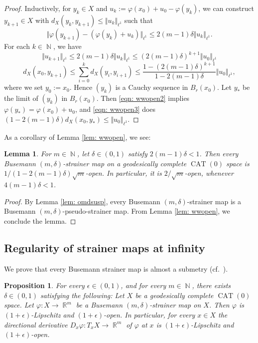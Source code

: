 \documentclass[a4paper,12pt]{amsart}
\newcommand{\CAT}{\operatorname{CAT}}
\newcommand{\R}{\operatorname{\mathbb{R}}}
\newcommand{\N}{\operatorname{\mathbb{N}}}
\numberwithin{equation}{section}
\theoremstyle{plain}
\newtheorem{lem}[thm]{Lemma}
\newtheorem{prop}[thm]{Proposition}
\theoremstyle{definition}
\theoremstyle{remark}
\begin{document}
\begin{proof}
Inductively,
for $y_k \in X$ and $u_k := \varphi(x_0) + u_0 - \varphi(y_k)$,
we can construct 
$y_{k+1} \in X$ with $d_X(y_k,y_{k+1}) \le \Vert u_k \Vert_{\ell^1}$
such that
\[
\Vert \varphi(y_{k+1}) - (\varphi(y_k) + u_k) \Vert_{\ell^1}
\le 2(m-1) \delta \Vert u_k \Vert_{\ell^1}.
\]
For each $k \in \N$, we have
\begin{equation}
\Vert u_{k+1} \Vert_{\ell^1}
\le 2(m-1) \delta \Vert u_k \Vert_{\ell^1}
\le (2(m-1) \delta)^{k+1} \Vert u_0 \Vert_{\ell^1}
\label{eqn: wwopen2}
\end{equation}
\begin{equation}
d_X(x_0,y_{k+1}) \le \sum_{i=0}^kd_X(y_i,y_{i+1})
\le \frac{1-(2(m-1)\delta)^{k+1}}{1-2(m-1)\delta} 
\Vert u_0 \Vert_{\ell^1},
\label{eqn: wwopen3}
\end{equation}
where we set $y_0 := x_0$.
Hence $(y_k)$ is a Cauchy sequence in $B_r(x_0)$.
Let $y_{\ast}$ be the limit of $(y_k)$ in $B_r(x_0)$.
Then \eqref{eqn: wwopen2} implies 
$\varphi(y_{\ast}) = \varphi(x_0) + u_0$,
and \eqref{eqn: wwopen3}
does
$(1-2(m-1)\delta) d_X(x_0,y_{\ast}) \le \Vert u_0 \Vert_{\ell^1}$.
\end{proof}

As a corollary of Lemma \ref{lem: wwopen},
we see:

\begin{lem}\label{lem: wopen}
For $m \in \N$, 
let $\delta \in (0,1)$ satisfy $2(m-1)\delta < 1$.
Then every Busemann $(m,\delta)$-strainer map 
on a geodesically complete $\CAT(0)$ space
is $1/(1-2(m-1)\delta)\sqrt{m}$-open.
In particular,
it is $2/\sqrt{m}$-open,
whenever $4(m-1)\delta < 1$.
\end{lem}

\begin{proof}
By Lemma \ref{lem: omdsusp},
every Busemann $(m,\delta)$-strainer map is
a Busemann $(m,\delta)$-pseudo-strainer map.
From Lemma \ref{lem: wwopen},
we conclude the lemma.
\end{proof}

\subsection{Regularity of strainer maps at infinity}

We prove that every Busemann strainer map
is almost a submetry
(cf.~\cite[Subsection 8.3]{lytchak-nagano1}).

\begin{prop}
\label{prop: almsubm}
For every $\epsilon \in (0,1)$,
and for every $m \in \N$,
there exists $\delta \in (0,1)$ satisfying the following:
Let $X$ be a geodesically complete $\CAT(0)$ space.
Let $\varphi \colon X \to \R^m$ be 
a Busemann $(m,\delta)$-strainer map on $X$.
Then $\varphi$ is $(1+\epsilon)$-Lipschitz and $(1+\epsilon)$-open.
In particular,
for every $x \in X$
the directional derivative $D_x\varphi \colon T_xX \to \R^m$
of $\varphi$ at $x$
is $(1+\epsilon)$-Lipschitz and $(1+\epsilon)$-open.
\end{prop}
\end{document}
